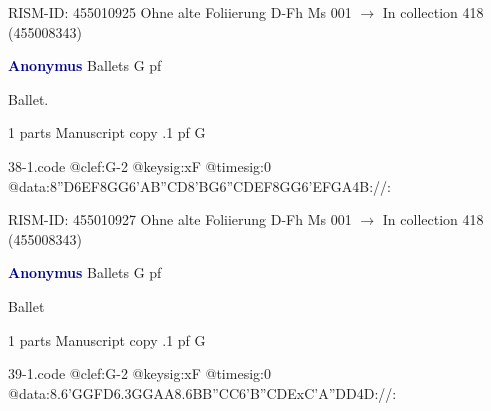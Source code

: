 \documentclass[twocolumn]{book}
\begin{document}
\newline RISM-ID: 455010925
\newline Ohne alte Foliierung
\newline D-Fh  Ms 001
\newline $\rightarrow$ In collection 418 (455008343)

\newline \par \vspace{7pt} \textcolor{darkblue}{\textbf{Anonymus  }}
\newline Ballets  G  
\newline pf
\newline \begin{itshape}[f.58v, at left:] Ballet.\end{itshape} 
\newline \textcolor{darkblue}{}  1 parts  
\newline Manuscript copy
.1  pf  G  
\begin{filecontents*}{38-1.code}
@clef:G-2
@keysig:xF
@timesig:0
@data:{8''D6EF8GG}{6'AB''CD}{8'BG}{6''CDEF}{8GG}{6'EFGA}4B://:
\end{filecontents*}
\newline
%

\newline RISM-ID: 455010927
\newline Ohne alte Foliierung
\newline D-Fh  Ms 001
\newline $\rightarrow$ In collection 418 (455008343)

\newline \par \vspace{7pt} \textcolor{darkblue}{\textbf{Anonymus  }}
\newline Ballets  G  
\newline pf
\newline \begin{itshape}[f.80v, at left:] Ballet\end{itshape} 
\newline \textcolor{darkblue}{}  1 parts  
\newline Manuscript copy
.1  pf  G  
\begin{filecontents*}{39-1.code}
@clef:G-2
@keysig:xF
@timesig:0
@data:8.6{'GG}{FD}{6.3GGAA}{8.6BB}{''CC}{6'B''CDE}{xC'A''DD}4D://:
\end{filecontents*}
\newline
%
\end{document}

